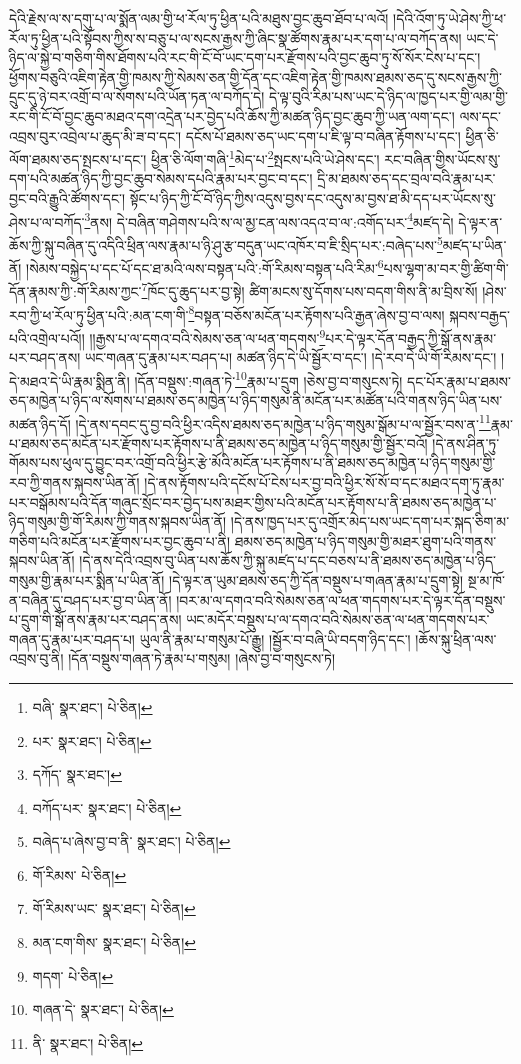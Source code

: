 དེའི་རྗེས་ལ་ས་དགུ་པ་ལ་སྨོན་ལམ་གྱི་ཕ་རོལ་ཏུ་ཕྱིན་པའི་མཐུས་བྱང་ཆུབ་ཐོབ་པ་ལའོ། །དེའི་འོག་ཏུ་ཡེ་ཤེས་ཀྱི་ཕ་རོལ་ཏུ་ཕྱིན་པའི་སྟོབས་ཀྱིས་ས་བཅུ་པ་ལ་སངས་རྒྱས་ཀྱི་ཞིང་སྣ་ཚོགས་རྣམ་པར་དག་པ་ལ་བཀོད་ནས། ཡང་དེ་ཉིད་ལ་སྐྱེ་བ་གཅིག་གིས་ཐོགས་པའི་རང་གི་ངོ་བོ་ཡང་དག་པར་རྫོགས་པའི་བྱང་ཆུབ་ཏུ་སོ་སོར་ངེས་པ་དང་། ཕྱོགས་བཅུའི་འཇིག་རྟེན་གྱི་ཁམས་ཀྱི་སེམས་ཅན་གྱི་དོན་དང་འཇིག་རྟེན་གྱི་ཁམས་ཐམས་ཅད་དུ་སངས་རྒྱས་ཀྱི་དྲུང་དུ་ཉེ་བར་འགྲོ་བ་ལ་སོགས་པའི་ཡོན་ཏན་ལ་བཀོད་དེ། དེ་ལྟ་བུའི་རིམ་པས་ཡང་དེ་ཉིད་ལ་ཁྱད་པར་གྱི་ལམ་གྱི་རང་གི་ངོ་བོ་བྱང་ཆུབ་མཐའ་དག་འདྲེན་པར་བྱེད་པའི་ཆོས་ཀྱི་མཚན་ཉིད་བྱང་ཆུབ་ཀྱི་ཡན་ལག་དང་། ལས་དང་འབྲས་བུར་འབྲེལ་པ་ཆུད་མི་ཟ་བ་དང་། དངོས་པོ་ཐམས་ཅད་ཡང་དག་པ་ཇི་ལྟ་བ་བཞིན་རྟོགས་པ་དང་། ཕྱིན་ཅི་ལོག་ཐམས་ཅད་སྤངས་པ་དང་། ཕྱིན་ཅི་ལོག་གཞི་\footnote{བཞི་  སྣར་ཐང་།  པེ་ཅིན། }མེད་པ་\footnote{པར་  སྣར་ཐང་།  པེ་ཅིན། }སྤངས་པའི་ཡེ་ཤེས་དང་། རང་བཞིན་གྱིས་ཡོངས་སུ་དག་པའི་མཚན་ཉིད་ཀྱི་བྱང་ཆུབ་སེམས་དཔའི་རྣམ་པར་བྱང་བ་དང་། དྲི་མ་ཐམས་ཅད་དང་བྲལ་བའི་རྣམ་པར་བྱང་བའི་རྒྱུའི་ཚོགས་དང་། སྟོང་པ་ཉིད་ཀྱི་ངོ་བོ་ཉིད་ཀྱིས་འདུས་བྱས་དང་འདུས་མ་བྱས་ཐ་མི་དད་པར་ཡོངས་སུ་ཤེས་པ་ལ་བཀོད་\footnote{དཀོད་  སྣར་ཐང་། }ནས། དེ་བཞིན་གཤེགས་པའི་ས་ལ་མྱ་ངན་ལས་འདའ་བ་ལ་:འགོད་པར་\footnote{བཀོད་པར་  སྣར་ཐང་།  པེ་ཅིན། }མཛད་དེ། དེ་ལྟར་ན་ཆོས་ཀྱི་སྐུ་བཞིན་དུ་འདིའི་ཕྲིན་ལས་རྣམ་པ་ཉི་ཤུ་རྩ་བདུན་ཡང་འཁོར་བ་ཇི་སྲིད་པར་:བཞེད་པས་\footnote{བཞེད་པ་ཞེས་བྱ་བ་ནི་  སྣར་ཐང་།  པེ་ཅིན། }མཛད་པ་ཡིན་ནོ། །སེམས་བསྐྱེད་པ་དང་པོ་དང་ཐ་མའི་ལས་བསྟན་པའི་:གོ་རིམས་བསྟན་པའི་རིམ་\footnote{གོ་རིམས་  པེ་ཅིན། }པས་ལྷག་མ་བར་གྱི་ཚིག་གི་དོན་རྣམས་ཀྱི་:གོ་རིམས་ཀྱང་\footnote{གོ་རིམས་ཡང་  སྣར་ཐང་།  པེ་ཅིན། }ཁོང་དུ་ཆུད་པར་བྱ་སྟེ། ཚིག་མངས་སུ་དོགས་པས་བདག་གིས་ནི་མ་བྲིས་སོ། །ཤེས་རབ་ཀྱི་ཕ་རོལ་ཏུ་ཕྱིན་པའི་:མན་ངག་གི་\footnote{མན་ངག་གིས་  སྣར་ཐང་།  པེ་ཅིན། }བསྟན་བཅོས་མངོན་པར་རྟོགས་པའི་རྒྱན་ཞེས་བྱ་བ་ལས། སྐབས་བརྒྱད་པའི་འགྲེལ་པའོ།། །།རྒྱས་པ་ལ་དགའ་བའི་སེམས་ཅན་ལ་ཕན་གདགས་\footnote{གདག་  པེ་ཅིན། }པར་དེ་ལྟར་དོན་བརྒྱད་ཀྱི་སྒོ་ནས་རྣམ་པར་བཤད་ནས། ཡང་གཞན་དུ་རྣམ་པར་བཤད་པ། མཚན་ཉིད་དེ་ཡི་སྦྱོར་བ་དང་། །དེ་རབ་དེ་ཡི་གོ་རིམས་དང་། །དེ་མཐའ་དེ་ཡི་རྣམ་སྨིན་ནི། །དོན་བསྡུས་:གཞན་ཏེ་\footnote{གཞན་དེ་  སྣར་ཐང་།  པེ་ཅིན། }རྣམ་པ་དྲུག །ཅེས་བྱ་བ་གསུངས་ཏེ། དང་པོར་རྣམ་པ་ཐམས་ཅད་མཁྱེན་པ་ཉིད་ལ་སོགས་པ་ཐམས་ཅད་མཁྱེན་པ་ཉིད་གསུམ་ནི་མངོན་པར་མཚོན་པའི་གནས་ཉིད་ཡིན་པས་མཚན་ཉིད་དོ། །དེ་ནས་དབང་དུ་བྱ་བའི་ཕྱིར་འདིས་ཐམས་ཅད་མཁྱེན་པ་ཉིད་གསུམ་སྒོམ་པ་ལ་སྦྱོར་བས་ན་\footnote{ནི་  སྣར་ཐང་།  པེ་ཅིན། }རྣམ་པ་ཐམས་ཅད་མངོན་པར་རྫོགས་པར་རྟོགས་པ་ནི་ཐམས་ཅད་མཁྱེན་པ་ཉིད་གསུམ་གྱི་སྦྱོར་བའོ། །དེ་ནས་ཤིན་ཏུ་གོམས་པས་ཕུལ་དུ་བྱུང་བར་འགྲོ་བའི་ཕྱིར་རྩེ་མོའི་མངོན་པར་རྟོགས་པ་ནི་ཐམས་ཅད་མཁྱེན་པ་ཉིད་གསུམ་གྱི་རབ་ཀྱི་གནས་སྐབས་ཡིན་ནོ། །དེ་ནས་རྟོགས་པའི་དངོས་པོ་ངེས་པར་བྱ་བའི་ཕྱིར་སོ་སོ་བ་དང་མཐའ་དག་ཏུ་རྣམ་པར་བསྒོམས་པའི་དོན་གཞུང་སྲོང་བར་བྱེད་པས་མཐར་གྱིས་པའི་མངོན་པར་རྟོགས་པ་ནི་ཐམས་ཅད་མཁྱེན་པ་ཉིད་གསུམ་གྱི་གོ་རིམས་ཀྱི་གནས་སྐབས་ཡིན་ནོ། །དེ་ནས་ཁྱད་པར་དུ་འགྲོར་མེད་པས་ཡང་དག་པར་སྐད་ཅིག་མ་གཅིག་པའི་མངོན་པར་རྫོགས་པར་བྱང་ཆུབ་པ་ནི། ཐམས་ཅད་མཁྱེན་པ་ཉིད་གསུམ་གྱི་མཐར་ཐུག་པའི་གནས་སྐབས་ཡིན་ནོ། །དེ་ནས་དེའི་འབྲས་བུ་ཡིན་པས་ཆོས་ཀྱི་སྐུ་མཛད་པ་དང་བཅས་པ་ནི་ཐམས་ཅད་མཁྱེན་པ་ཉིད་གསུམ་གྱི་རྣམ་པར་སྨིན་པ་ཡིན་ནོ། །དེ་ལྟར་ན་ཡུམ་ཐམས་ཅད་ཀྱི་དོན་བསྡུས་པ་གཞན་རྣམ་པ་དྲུག་སྟེ། སྔ་མ་ཁོ་ན་བཞིན་དུ་བཤད་པར་བྱ་བ་ཡིན་ནོ། །བར་མ་ལ་དགའ་བའི་སེམས་ཅན་ལ་ཕན་གདགས་པར་དེ་ལྟར་དོན་བསྡུས་པ་དྲུག་གི་སྒོ་ནས་རྣམ་པར་བཤད་ནས། ཡང་མདོར་བསྡུས་པ་ལ་དགའ་བའི་སེམས་ཅན་ལ་ཕན་གདགས་པར་གཞན་དུ་རྣམ་པར་བཤད་པ། ཡུལ་ནི་རྣམ་པ་གསུམ་པོ་རྒྱུ། །སྦྱོར་བ་བཞི་ཡི་བདག་ཉིད་དང་། །ཆོས་སྐུ་ཕྲིན་ལས་འབྲས་བུ་ནི། །དོན་བསྡུས་གཞན་ཏེ་རྣམ་པ་གསུམ། །ཞེས་བྱ་བ་གསུངས་ཏེ། 